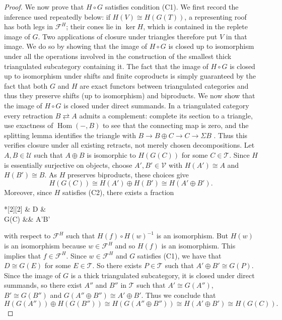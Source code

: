 \documentclass[11pt,reqno,a4paper]{amsart}
\theoremstyle{definition}
\theoremstyle{remark}
\newcommand{\T}{\mathcal{T}}
\newcommand{\U}{\mathcal{U}}
\newcommand{\V}{\mathcal{V}}
\newcommand{\F}{\mathcal{F}}
\newcommand{\0}{\mathbf{0}}
\renewcommand{\1}{\mathbf{1}}
\def\c{\circ}
\newcommand{\iso}{\cong}
\newcommand{\aiso}[1]{\overset{#1}{\iso}}
\begin{document}
\begin{proof}
    We now prove that $H\c G$ satisfies condition (C1). We first record the inference used repeatedly below: if $H(V)\cong H(G(T))$, a representing roof has both legs in $\mathcal F^H$; their cones lie in $\ker H$, which is contained in the replete image of $G$. Two applications of closure under triangles therefore put $V$ in that image. We do so by showing that the image of $H\c G$ is closed up to isomorphism under all the operations involved in the construction of the smallest thick triangulated subcategory containing it. The fact that the image of $H\c G$ is closed up to isomorphism under shifts and finite coproducts is simply guaranteed by the fact that both $G$ and $H$ are exact functors between triangulated categories and thus they preserve shifts (up to isomorphism) and biproducts. We now show that the image of $H\c G$ is closed under direct summands. In a triangulated category every retraction $B\rightleftarrows A$ admits a complement: complete its section to a triangle, use exactness of $\operatorname{Hom}(-,B)$ to see that the connecting map is zero, and the splitting lemma identifies the triangle with $B\to B\oplus C\to C\to\Sigma B$ \cite[Section 13.4]{StacksDerived}. Thus this verifies closure under all existing retracts, not merely chosen decompositions. Let $A,B\in\U$ such that $A \oplus B$ is isomorphic to $H(G(C))$ for some $C\in \T$. Since $H$ is essentially surjective on objects, choose $A',B'\in\V$ with $H(A')\cong A$ and $H(B')\cong B$. As $H$ preserves biproducts, these choices give
    $$H(G(C)) \iso H(A') \oplus H(B') \iso H(A' \oplus B').$$
    Moreover, since $H$ satisfies (C2), there exists a fraction \begin{cd}*[2][2] \& D \& \\[-2ex]
	G(C) \&\& {A'\oplus B'}
	\arrow["w"', from=1-2, to=2-1]
	\arrow["f", from=1-2, to=2-3]\end{cd} with respect to $\F^H$ such that $H(f) \c H(w)^{-1}$ is an isomorphism. But $H(w)$ is an isomorphism because $w\in \F^H$ and so $H(f)$ is an isomorphism. This implies that $f\in \F^H$. Since $w\in \F^H$ and $G$ satisfies (C1), we have that $D\aiso{} G(E)$ for some $E\in \T$. So there exists $P\in \T$ such that $A'\oplus B' \aiso{} G(P)$. Since the image of $G$ is a thick triangulated subcategory, it is closed under direct summands, so there exist  $A''$ and $B''$ in $\T$ such that $A'\iso G(A'')$, $B' \aiso{} G(B'')$ and $G(A'' \oplus B'')\aiso{} A' \oplus B'$. Thus we conclude that
    $$H(G(A'')) \oplus H(G(B'')) \aiso{} H(G(A''\oplus B'')) \aiso{} H(A' \oplus B') \aiso{} H(G(C)).$$

\end{proof}
\end{document}
